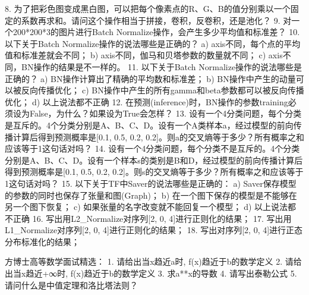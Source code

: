 8. 为了把彩色图变成黑白图，可以把每个像素点的R、G、B的值分别乘以一个固定的系数再求和。请问这个操作相当于拼接，卷积，反卷积，还是池化？
9. 对一个200*200*3的图片进行Batch Normalize操作，会产生多少平均值和标准差？
10. 以下关于Batch Normalize操作的说法哪些是正确的？a) axis不同，每个点的平均值和标准差就会不同；b) axis不同，伽马和贝塔参数的数量就不同；c) axis不同，BN操作的结果是不一样的。
11. 以下关于Batch Normalize操作的说法哪些是正确的？a) BN操作计算出了精确的平均数和标准差；b) BN操作中产生的动量可以被反向传播优化；c) BN操作中产生的所有gamma和beta参数都可以被反向传播优化；d) 以上说法都不正确
12. 在预测(inference)时，BN操作的参数training必须设为False，为什么？如果设为True会怎样？
13. 设有一个4分类问题，每个分类是互斥的。4个分类分别是A、B、C、D。设有一个A类样本a，经过模型的前向传播计算后得到预测概率是[0.1, 0.5, 0.2, 0.2]。则a的交叉熵等于多少？所有概率之和应该等于1这句话对吗？
14. 设有一个4分类问题，每个分类不是互斥的。4个分类分别是A、B、C、D。设有一个样本s的类别是B和D，经过模型的前向传播计算后得到预测概率是[0.1, 0.5, 0.2, 0.2]。则s的交叉熵等于多少？所有概率之和应该等于1这句话对吗？
15. 以下关于TF中Saver的说法哪些是正确的：a) Saver保存模型的参数的同时也保存了张量和图(Graph)；b) 在一个图下保存的模型是不能够在另一个图下恢复；c) 如果张量的名字改变就不能回复一个模型；d) 以上说法都不正确
16. 写出用L2_Normalize对序列[2, 0, 4]进行正则化的结果；
17. 写出用L1_Normalize对序列[2, 0, 4]进行正则化的结果； 
18. 写出对序列[2, 0, 4]进行正态分布标准化的结果；


方博士高等数学面试精选：
1. 请给出当x趋近a时, f(x)趋近于b的数学定义
2. 请给出当x趋近+∞时, f(x)趋近于b的数学定义
3. 求a**x的导数
4. 请写出泰勒公式
5. 请问什么是中值定理和洛比塔法则？